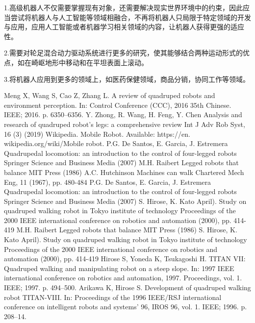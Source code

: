 \documentclass[12pt,a4paper]{ctexart}
\begin{document}
{1.高级机器人不仅需要掌握现有对象，还需要解决现实世界环境中的约束，因此应当尝试将机器人与人工智能等领域相融合，不再将机器人只局限于特定领域的开发与应用，应用人工智能或者机器学习相关领域的内容，让机器人获得更强的适应性。

2.需要对轮足混合动力驱动系统进行更多的研究，使其能够结合两种运动形式的优点，如在崎岖地形中移动和在平坦表面上滚动。

3.将机器人应用到更多的领域上，如医药保健领域，商品分销，协同工作等领域。

\small

\begin{thebibliography}{99}
	\setlength{\parskip}{0pt}

	 Meng X, Wang S, Cao Z, Zhang L. A review of quadruped robots and environment perception. In: Control Conference (CCC), 2016 35th Chinese. IEEE; 2016. p. 6350–6356.
	 Y. Zhong, R. Wang, H. Feng, Y. Chen
	Analysis and research of quadruped robot’s legs: a comprehensive review
	Int J Adv Rob Syst, 16 (3) (2019)
	 Wikipedia. Mobile Robot. Available: https://en. wikipedia.org/wiki/Mobile robot.
	 P.G. De Santos, E. Garcia, J. Estremera
	Quadrupedal locomotion: an introduction to the control of four-legged robots
	Springer Science and Business Media (2007)
	 M.H. Raibert
	Legged robots that balance
	MIT Press (1986)
	 A.C. Hutchinson
	Machines can walk
	Chartered Mech Eng, 11 (1967), pp. 480-484
	 P.G. De Santos, E. Garcia, J. Estremera
	Quadrupedal locomotion: an introduction to the control of four-legged robots
	Springer Science and Business Media (2007)
	 S. Hirose, K. Kato
	April). Study on quadruped walking robot in Tokyo institute of technology
	Proceedings of the 2000 IEEE international conference on robotics and automation (2000), pp. 414-419
	 M.H. Raibert
	Legged robots that balance
	MIT Press (1986)
	 S. Hirose, K. Kato
	April). Study on quadruped walking robot in Tokyo institute of technology
	Proceedings of the 2000 IEEE international conference on robotics and automation (2000), pp. 414-419
	 Hirose S, Yoneda K, Tsukagoshi H. TITAN VII: Quadruped walking and manipulating robot on a steep slope. In: 1997 IEEE international conference on robotics and automation, 1997. Proceedings, vol. 1. IEEE; 1997. p. 494–500.
	 Arikawa K, Hirose S. Development of quadruped walking robot TITAN-VIII. In: Proceedings of the 1996 IEEE/RSJ international conference on intelligent robots and systems' 96, IROS 96, vol. 1. IEEE; 1996. p. 208–14.

\end{thebibliography}}
\end{document}
